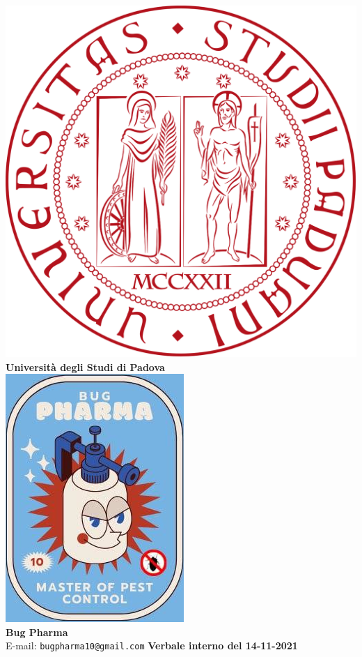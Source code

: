 \documentclass[11pt]{article}
\begin{document}
	\thispagestyle{empty}
	\begin{titlepage}
		\begin{center}
			\includegraphics[scale = 0.05]{../../logo_unipd.png}\\
			\large \textbf{Università degli Studi di Padova} \\
			\vfill
			\includegraphics[scale = 0.7]{../../logo_small.jpg}\\
			\large \textbf{Bug Pharma} \\
			\vfill
			\large
			E-mail: 
			\texttt{bugpharma10@gmail.com}
			\vfill
			\Huge \textbf{Verbale interno del 14-11-2021}\\
			

\end{center}
\end{titlepage}
\end{document}
